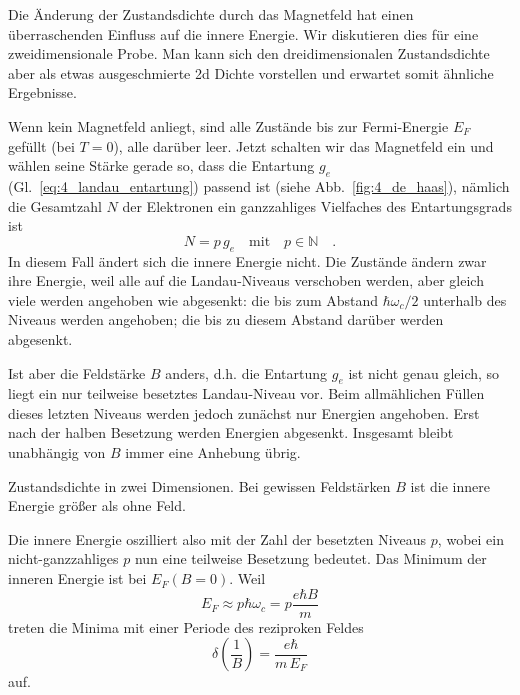 Die Änderung der Zustandsdichte durch das Magnetfeld hat einen überraschenden Einfluss auf die innere Energie. Wir diskutieren dies  für eine zweidimensionale Probe. Man kann sich den dreidimensionalen Zustandsdichte aber als etwas ausgeschmierte 2d Dichte vorstellen und erwartet somit ähnliche Ergebnisse.

Wenn kein Magnetfeld anliegt, sind alle Zustände bis zur Fermi-Energie $E_F$ gefüllt (bei $T=0$), alle darüber leer. Jetzt schalten wir das Magnetfeld ein und wählen seine Stärke gerade so, dass die Entartung $g_e$ (Gl.~\ref{eq:4_landau_entartung}) passend ist (siehe Abb.~\ref{fig:4_de_haas}), nämlich  die Gesamtzahl $N$ der Elektronen ein ganzzahliges Vielfaches des Entartungsgrads ist
\begin{equation}
   N = p \, g_e \quad \text{mit} \quad p \in \mathbb{N}  \quad .
\end{equation}
In diesem Fall ändert sich die innere Energie nicht. Die Zustände ändern zwar ihre Energie, weil alle auf die Landau-Niveaus verschoben  werden, aber gleich viele werden angehoben wie abgesenkt: die bis zum Abstand $\hbar \omega_c/2$ unterhalb des Niveaus werden angehoben; die bis zu diesem Abstand darüber werden abgesenkt.

Ist aber die Feldstärke $B$ anders, d.h. die Entartung $g_e$ ist nicht genau gleich, so liegt ein nur teilweise besetztes Landau-Niveau vor. Beim allmählichen Füllen dieses letzten Niveaus werden jedoch zunächst nur Energien angehoben. Erst nach der halben Besetzung werden Energien abgesenkt. Insgesamt bleibt unabhängig von $B$ immer eine Anhebung übrig.

\begin{marginfigure}
   \caption{Zustandsdichte in zwei Dimensionen. Bei gewissen Feldstärken $B$ ist die innere Energie größer als ohne Feld. \label{fig:4_de_haas} }
\end{marginfigure}



Die innere Energie oszilliert also mit der Zahl der besetzten Niveaus $p$, wobei ein nicht-ganzzahliges $p$ nun eine teilweise Besetzung bedeutet. Das Minimum der inneren Energie ist bei $E_F(B=0)$.
Weil
\begin{equation}
   E_F \approx p \hbar \omega_c = p \frac{e \hbar B}{m} 
\end{equation}
treten die Minima mit einer Periode des reziproken Feldes   
\begin{equation}
   \delta \left(\frac{1}{B}  \right) = \frac{e \hbar }{m \, E_F}
\end{equation}
auf.


